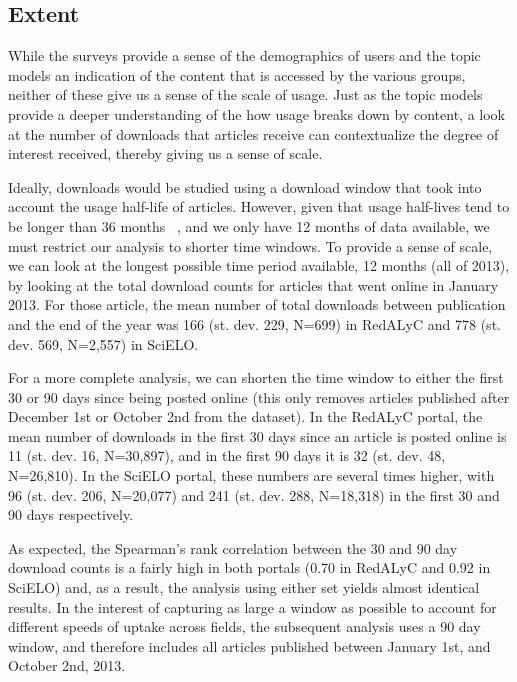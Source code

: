 \subsection{Extent}
\label{extent}

While the surveys provide a sense of the demographics of users and the topic models an indication of the content that is accessed by the various groups, neither of these give us a sense of the scale of usage. Just as the topic models provide a deeper understanding of the how usage breaks down by content, a look at the number of downloads that articles receive can contextualize the degree of interest received, thereby giving us a sense of scale.

Ideally, downloads would be studied using a download window that took into account the usage half-life of articles. However, given that usage half-lives tend to be longer than 36 months ~\citep{Davis2013}, and we only have 12 months of data available, we must restrict our analysis to shorter time windows. To provide a sense of scale, we can look at the longest possible time period available, 12 months (all of 2013), by looking at the total download counts for articles that went online in January 2013. For those article, the mean number of total downloads between publication and the end of the year was 166 (st. dev. 229, N=699) in RedALyC and 778 (st. dev. 569, N=2,557) in SciELO.

For a more complete analysis, we can shorten the time window to either the first 30 or 90 days since being posted online (this only removes articles published after December 1st or October 2nd from the dataset). In the RedALyC portal, the mean number of downloads in the first 30 days since an article is posted online is 11 (st. dev. 16, N=30,897), and in the first 90 days it is 32 (st. dev. 48, N=26,810). In the SciELO portal, these numbers are several times higher, with 96 (st. dev. 206, N=20,077) and 241 (st. dev. 288, N=18,318) in the first 30 and 90 days respectively.

As expected, the Spearman's rank correlation between the 30 and 90 day download counts is a fairly high in both portals (0.70 in RedALyC and 0.92 in SciELO) and, as a result, the analysis using either set yields almost identical results. In the interest of capturing as large a window as possible to account for different speeds of uptake across fields, the subsequent analysis uses a 90 day window, and therefore includes all articles published between January 1st, and October 2nd, 2013.

